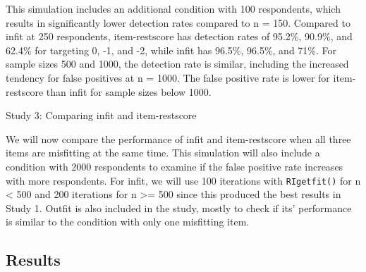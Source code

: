 \documentclass[
  letterpaper,
  DIV=11,
  numbers=noendperiod]{scrartcl}
\begin{document}
This simulation includes an additional condition with 100 respondents,
which results in significantly lower detection rates compared to n =
150. Compared to infit at 250 respondents, item-restscore has detection
rates of 95.2\%, 90.9\%, and 62.4\% for targeting 0, -1, and -2, while
infit has 96.5\%, 96.5\%, and 71\%. For sample sizes 500 and 1000, the
detection rate is similar, including the increased tendency for false
positives at n = 1000. The false positive rate is lower for
item-restscore than infit for sample sizes below 1000.

Study 3: Comparing infit and item-restscore

We will now compare the performance of infit and item-restscore when all
three items are misfitting at the same time. This simulation will also
include a condition with 2000 respondents to examine if the false
positive rate increases with more respondents. For infit, we will use
100 iterations with \texttt{RIgetfit()} for n \textless{} 500 and 200
iterations for n \textgreater= 500 since this produced the best results
in Study 1. Outfit is also included in the study, mostly to check if
its' performance is similar to the condition with only one misfitting
item.

\subsection{Results}\label{results-2}
\end{document}
